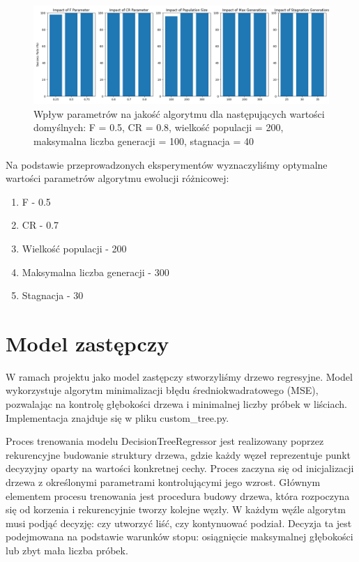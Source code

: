 \documentclass{article}
\begin{document}
\begin{figure}[H]
    \centering
    \includegraphics[width=\textwidth]{parameter_tuning_results_separate4.png}
    \caption{Wpływ parametrów na jakość algorytmu dla następujących wartości domyślnych: F = 0.5, CR = 0.8, wielkość populacji = 200, maksymalna liczba generacji = 100, stagnacja = 40}
    \label{fig:parameter_results4}
\end{figure}

Na podstawie przeprowadzonych eksperymentów wyznaczyliśmy optymalne wartości parametrów algorytmu ewolucji różnicowej:
\begin{enumerate}
    \item F - 0.5
    \item CR - 0.7
    \item Wielkość populacji - 200
    \item Maksymalna liczba generacji - 300
    \item Stagnacja - 30
\end{enumerate}


\section{Model zastępczy}
W ramach projektu jako model zastępczy stworzyliśmy drzewo regresyjne. Model wykorzystuje algorytm minimalizacji błędu średniokwadratowego (MSE), pozwalając na kontrolę głębokości drzewa i minimalnej liczby próbek w liściach. Implementacja znajduje się w pliku custom\_tree.py.

Proces trenowania modelu DecisionTreeRegressor jest realizowany poprzez rekurencyjne budowanie struktury drzewa, gdzie każdy węzeł reprezentuje punkt decyzyjny oparty na wartości konkretnej cechy.  Proces zaczyna się od inicjalizacji drzewa z określonymi parametrami kontrolującymi jego wzrost. Głównym elementem procesu trenowania jest procedura budowy drzewa, która rozpoczyna się od korzenia i rekurencyjnie tworzy kolejne węzły. W każdym węźle algorytm musi podjąć decyzję: czy utworzyć liść, czy kontynuować podział. Decyzja ta jest podejmowana na podstawie warunków stopu: osiągnięcie maksymalnej głębokości lub zbyt mała liczba próbek.
\end{document}
